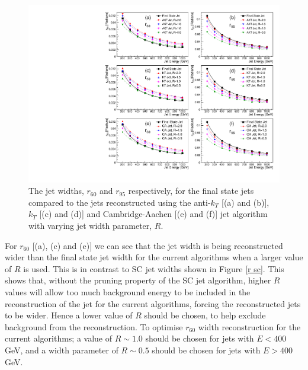 \documentclass[a4paper,11pt, onecolumn]{article}
\begin{document}
  \begin{figure}[!htb]
    \begin{center}
      \includegraphics[width = \textwidth]{r_all}
      \caption{The jet widths, $r_{60}$ and $r_{95}$ respectively, for the final state jets compared to the jets reconstructed using the anti-$k_{T}$ [(a) and (b)], 
               $k_{T}$ [(c) and (d)] and Cambridge-Aachen [(e) and (f)] jet algorithm with varying jet width parameter, $R$.}
      \label{r all}
    \end{center}
    \vspace{-0.4cm}
  \end{figure}

  For $r_{60}$ [(a), (c) and (e)] we can see that the jet width is being reconstructed wider than the final state jet width for 
  the current algorithms when a larger value of $R$ is used. This is in contrast to SC jet widths shown in Figure \ref{r sc}. This shows that, without 
  the pruning property of the SC jet algorithm, higher $R$ values will allow too much background energy to be included in the reconstruction of the jet for the current 
  algorithms, forcing the reconstructed jets to be wider.
  Hence a lower value of $R$ should be chosen, to help exclude background from the reconstruction. To optimise $r_{60}$ width reconstruction for the 
  current algorithms; a value of $R \sim 1.0$ should be chosen for jets with $E < 400$ GeV, and a width parameter of $R \sim 0.5$ should be chosen for jets with 
  $E > 400$ GeV. \\
\end{document}
